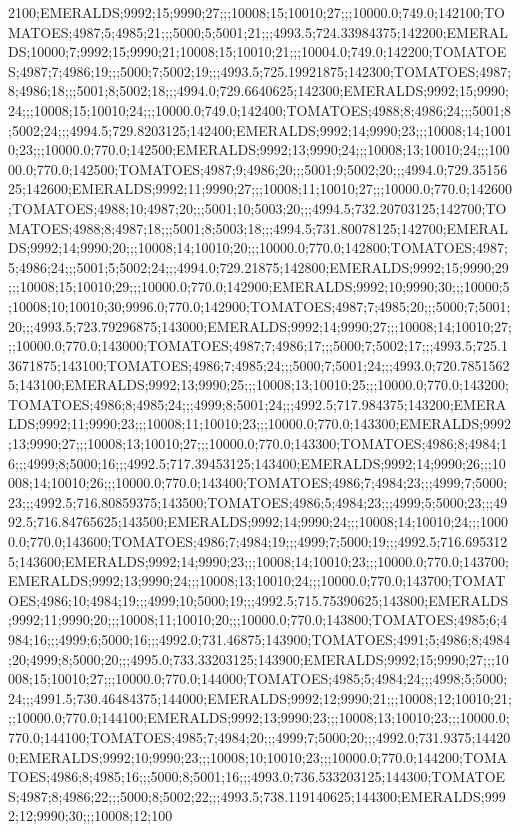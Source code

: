 2100;EMERALDS;9992;15;9990;27;;;10008;15;10010;27;;;10000.0;749.0;142100;TOMATOES;4987;5;4985;21;;;5000;5;5001;21;;;4993.5;724.33984375;142200;EMERALDS;10000;7;9992;15;9990;21;10008;15;10010;21;;;10004.0;749.0;142200;TOMATOES;4987;7;4986;19;;;5000;7;5002;19;;;4993.5;725.19921875;142300;TOMATOES;4987;8;4986;18;;;5001;8;5002;18;;;4994.0;729.6640625;142300;EMERALDS;9992;15;9990;24;;;10008;15;10010;24;;;10000.0;749.0;142400;TOMATOES;4988;8;4986;24;;;5001;8;5002;24;;;4994.5;729.8203125;142400;EMERALDS;9992;14;9990;23;;;10008;14;10010;23;;;10000.0;770.0;142500;EMERALDS;9992;13;9990;24;;;10008;13;10010;24;;;10000.0;770.0;142500;TOMATOES;4987;9;4986;20;;;5001;9;5002;20;;;4994.0;729.3515625;142600;EMERALDS;9992;11;9990;27;;;10008;11;10010;27;;;10000.0;770.0;142600;TOMATOES;4988;10;4987;20;;;5001;10;5003;20;;;4994.5;732.20703125;142700;TOMATOES;4988;8;4987;18;;;5001;8;5003;18;;;4994.5;731.80078125;142700;EMERALDS;9992;14;9990;20;;;10008;14;10010;20;;;10000.0;770.0;142800;TOMATOES;4987;5;4986;24;;;5001;5;5002;24;;;4994.0;729.21875;142800;EMERALDS;9992;15;9990;29;;;10008;15;10010;29;;;10000.0;770.0;142900;EMERALDS;9992;10;9990;30;;;10000;5;10008;10;10010;30;9996.0;770.0;142900;TOMATOES;4987;7;4985;20;;;5000;7;5001;20;;;4993.5;723.79296875;143000;EMERALDS;9992;14;9990;27;;;10008;14;10010;27;;;10000.0;770.0;143000;TOMATOES;4987;7;4986;17;;;5000;7;5002;17;;;4993.5;725.13671875;143100;TOMATOES;4986;7;4985;24;;;5000;7;5001;24;;;4993.0;720.78515625;143100;EMERALDS;9992;13;9990;25;;;10008;13;10010;25;;;10000.0;770.0;143200;TOMATOES;4986;8;4985;24;;;4999;8;5001;24;;;4992.5;717.984375;143200;EMERALDS;9992;11;9990;23;;;10008;11;10010;23;;;10000.0;770.0;143300;EMERALDS;9992;13;9990;27;;;10008;13;10010;27;;;10000.0;770.0;143300;TOMATOES;4986;8;4984;16;;;4999;8;5000;16;;;4992.5;717.39453125;143400;EMERALDS;9992;14;9990;26;;;10008;14;10010;26;;;10000.0;770.0;143400;TOMATOES;4986;7;4984;23;;;4999;7;5000;23;;;4992.5;716.80859375;143500;TOMATOES;4986;5;4984;23;;;4999;5;5000;23;;;4992.5;716.84765625;143500;EMERALDS;9992;14;9990;24;;;10008;14;10010;24;;;10000.0;770.0;143600;TOMATOES;4986;7;4984;19;;;4999;7;5000;19;;;4992.5;716.6953125;143600;EMERALDS;9992;14;9990;23;;;10008;14;10010;23;;;10000.0;770.0;143700;EMERALDS;9992;13;9990;24;;;10008;13;10010;24;;;10000.0;770.0;143700;TOMATOES;4986;10;4984;19;;;4999;10;5000;19;;;4992.5;715.75390625;143800;EMERALDS;9992;11;9990;20;;;10008;11;10010;20;;;10000.0;770.0;143800;TOMATOES;4985;6;4984;16;;;4999;6;5000;16;;;4992.0;731.46875;143900;TOMATOES;4991;5;4986;8;4984;20;4999;8;5000;20;;;4995.0;733.33203125;143900;EMERALDS;9992;15;9990;27;;;10008;15;10010;27;;;10000.0;770.0;144000;TOMATOES;4985;5;4984;24;;;4998;5;5000;24;;;4991.5;730.46484375;144000;EMERALDS;9992;12;9990;21;;;10008;12;10010;21;;;10000.0;770.0;144100;EMERALDS;9992;13;9990;23;;;10008;13;10010;23;;;10000.0;770.0;144100;TOMATOES;4985;7;4984;20;;;4999;7;5000;20;;;4992.0;731.9375;144200;EMERALDS;9992;10;9990;23;;;10008;10;10010;23;;;10000.0;770.0;144200;TOMATOES;4986;8;4985;16;;;5000;8;5001;16;;;4993.0;736.533203125;144300;TOMATOES;4987;8;4986;22;;;5000;8;5002;22;;;4993.5;738.119140625;144300;EMERALDS;9992;12;9990;30;;;10008;12;100